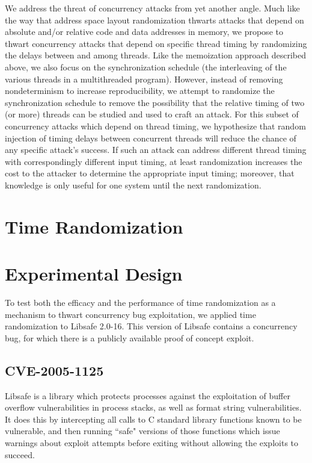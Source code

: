 \documentclass[letterpaper,twocolumn,10pt]{article}
\begin{document}
We address the threat of concurrency attacks from yet another angle.  Much like the way that address space layout randomization thwarts attacks that depend on absolute and/or relative code and data addresses in memory, we propose to thwart concurrency attacks that depend on specific thread timing by randomizing the delays between and among threads.  Like the memoization approach described above, we also focus on the synchronization schedule (the interleaving of the various threads in a multithreaded program).  However, instead of removing nondeterminism to increase reproducibility, we attempt to randomize the synchronization schedule to remove the possibility that the relative timing of two (or more) threads can be studied and used to craft an attack.  For this subset of concurrency attacks which depend on thread timing, we hypothesize that random injection of timing delays between concurrent threads will reduce the chance of any specific attack's success.  If such an attack can address different thread timing with correspondingly different input timing, at least randomization increases the cost to the attacker to determine the appropriate input timing; moreover, that knowledge is only useful for one system until the next randomization.

\section{Time Randomization}

\section{Experimental Design}
To test both the efficacy and the performance of time randomization as a mechanism to thwart concurrency bug exploitation, we applied time randomization to Libsafe 2.0-16.  This version of Libsafe contains a concurrency bug, for which there is a publicly available proof of concept exploit.
\subsection{CVE-2005-1125}
Libsafe is a library which protects processes against the exploitation of buffer overflow vulnerabilities in process stacks, as well as format string vulnerabilities.  It does this by intercepting all calls to C standard library functions known to be vulnerable, and then running ``safe" versions of those functions which issue warnings about exploit attempts before exiting without allowing the exploits to succeed.
\end{document}
